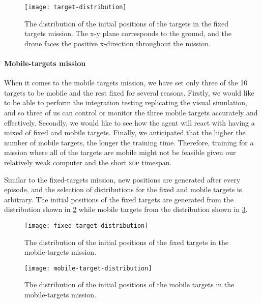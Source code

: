 \documentclass[../main.tex]{subfiles}
\begin{document}
\begin{figure}[tbp]
	\centering
	\texttt{[image: target-distribution]}
	\caption{The distribution of the initial positions of the
            targets in the fixed targets mission. The x-y plane
            corresponds to the ground, and the drone faces the positive
            x-direction throughout the mission.}
	\label{fig:position-distribution}
\end{figure}

\paragraph{Mobile-targets mission}

When it comes to the mobile targets mission, we have set only three of
the 10 targets to be mobile and the rest fixed for several reasons.
Firstly, we would like to be able to perform the integration testing
replicating the visual simulation, and so three of us can control or
monitor the three mobile targets accurately and effectively.
Secondly, we would like to see how the agent will react with having a
mixed of fixed and mobile targets.
Finally, we anticipated that the higher the number of mobile targets, the 
longer the training time. 
Therefore, training for a mission where all of the targets are mobile
might not be feasible given our relatively weak computer and the
short \textsc{sdp} timespan.

Similar to the fixed-targets mission, new positions are generated
after every episode, and the selection of distributions for the fixed
and mobile targets is arbitrary.
The initial positions of the fixed targets are generated from 
the distribution shown in
\cref{fig:fixed-position-distribution}
while mobile targets from the distribution shown in
\cref{fig:mobile-position-distribution}.

\begin{figure}[tbp]
	\centering
        \texttt{[image: fixed-target-distribution]}
	\caption{The distribution of the initial positions of the
        fixed targets in the mobile-targets mission.}
	\label{fig:fixed-position-distribution}
\end{figure}

\begin{figure}[tbp]
	\centering
	\texttt{[image: mobile-target-distribution]}
	\caption{The distribution of the initial positions of the
            mobile targets in the mobile-targets mission.}
	\label{fig:mobile-position-distribution}
\end{figure}
\end{document}
